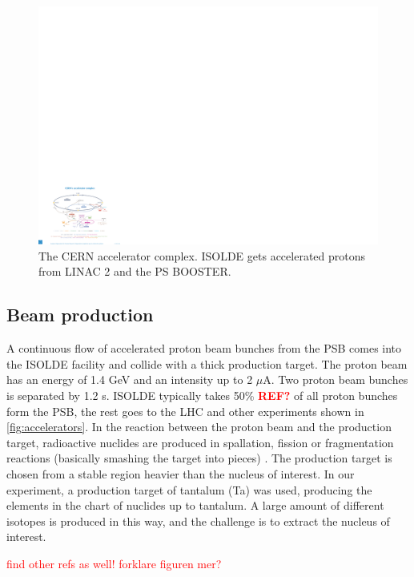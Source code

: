 \documentclass[twoside,english]{uiofysmaster/uiofysmaster}
\begin{document}
\begin{figure}[t]
	\centering
	\includegraphics[width=\textwidth]{images/0812015.pdf}
	\caption{The CERN accelerator complex. ISOLDE gets accelerated protons from LINAC 2 and the PS BOOSTER.}
	\label{fig:accelerators}
\end{figure}


\subsection{Beam production}
A continuous flow of accelerated proton beam bunches from the PSB comes into the ISOLDE facility and collide with a thick production target. The proton beam has an energy of 1.4 GeV and an intensity up to 2 $\mu$A. Two proton beam bunches is separated by 1.2 s. ISOLDE typically takes 50\% \textcolor{red}{\textbf{REF?}} of all proton bunches form the PSB, the rest goes to the LHC and other experiments shown in \autoref{fig:accelerators}. In the reaction between the proton beam and the production target, radioactive nuclides are produced in spallation, fission or fragmentation reactions (basically smashing the target into pieces) \cite{ISOLDE-web}. The production target is chosen from a stable region heavier than the nucleus of interest. In our experiment, a production target of tantalum (Ta) was used, producing the elements in the chart of nuclides up to tantalum. A large amount of different isotopes is produced in this way, and the challenge is to extract the nucleus of interest. 
 
\textcolor{red}{find other refs as well! forklare figuren mer?}


\bigskip
\end{document}
